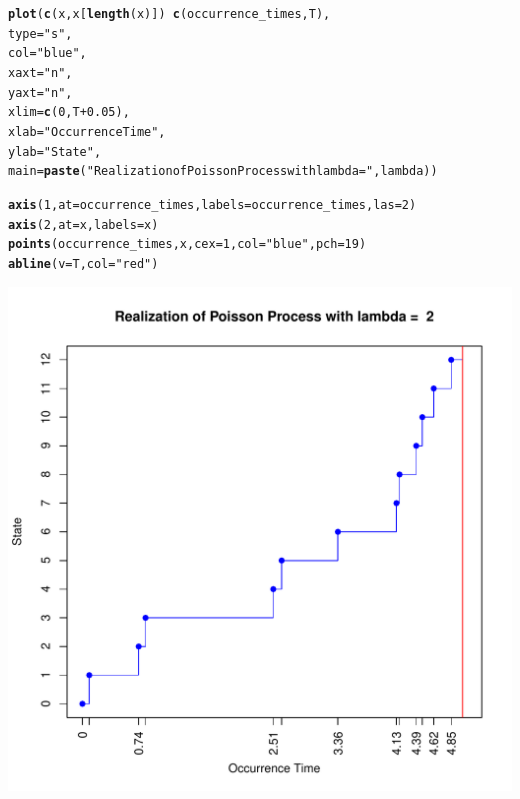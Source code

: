 \documentclass[11pt, a4paper]{article}\usepackage[]{graphicx}\usepackage[]{xcolor}
\makeatletter
\def\maxwidth{ %
  \ifdim\Gin@nat@width>\linewidth
    \linewidth
  \else
    \Gin@nat@width
  \fi
}
\newcommand{\hlnum}[1]{\textcolor[rgb]{0.686,0.059,0.569}{#1}}%
\newcommand{\hlsng}[1]{\textcolor[rgb]{0.192,0.494,0.8}{#1}}%
\newcommand{\hlopt}[1]{\textcolor[rgb]{0,0,0}{#1}}%
\newcommand{\hldef}[1]{\textcolor[rgb]{0.345,0.345,0.345}{#1}}%
\newcommand{\hlkwc}[1]{\textcolor[rgb]{0.333,0.667,0.333}{#1}}%
\newcommand{\hlkwd}[1]{\textcolor[rgb]{0.737,0.353,0.396}{\textbf{#1}}}%
\newenvironment{kframe}{%
 \def\at@end@of@kframe{}%
 \ifinner\ifhmode%
  \def\at@end@of@kframe{\end{minipage}}%
  \begin{minipage}{\columnwidth}%
 \fi\fi%
 \def\FrameCommand##1{\hskip\@totalleftmargin \hskip-\fboxsep
 \colorbox{shadecolor}{##1}\hskip-\fboxsep
     \hskip-\linewidth \hskip-\@totalleftmargin \hskip\columnwidth}%
 \MakeFramed {\advance\hsize-\width
   \@totalleftmargin\z@ \linewidth\hsize
   \@setminipage}}%
 {\par\unskip\endMakeFramed%
 \at@end@of@kframe}
\newenvironment{knitrout}{}{} %
\makeatother
\begin{document}
\begin{knitrout}
\color{fgcolor}\begin{kframe}
\begin{alltt}
\hlkwd{plot}\hldef{(}\hlkwd{c}\hldef{(x, x[}\hlkwd{length}\hldef{(x)])} \hlopt{~} \hlkwd{c}\hldef{(occurrence_times, T),}
     \hlkwc{type} \hldef{=} \hlsng{"s"}\hldef{,}
     \hlkwc{col} \hldef{=} \hlsng{"blue"}\hldef{,}
     \hlkwc{xaxt} \hldef{=} \hlsng{"n"}\hldef{,}
     \hlkwc{yaxt} \hldef{=} \hlsng{"n"}\hldef{,}
     \hlkwc{xlim} \hldef{=} \hlkwd{c}\hldef{(}\hlnum{0}\hldef{, T} \hlopt{+} \hlnum{0.05}\hldef{),}
     \hlkwc{xlab} \hldef{=} \hlsng{"Occurrence Time"}\hldef{,}
     \hlkwc{ylab} \hldef{=} \hlsng{"State"}\hldef{,}
     \hlkwc{main} \hldef{=} \hlkwd{paste}\hldef{(}\hlsng{"Realization of Poisson Process with lambda = "}\hldef{, lambda))}

\hlkwd{axis}\hldef{(}\hlnum{1}\hldef{,} \hlkwc{at} \hldef{= occurrence_times,} \hlkwc{labels} \hldef{= occurrence_times,} \hlkwc{las} \hldef{=} \hlnum{2}\hldef{)}
\hlkwd{axis}\hldef{(}\hlnum{2}\hldef{,} \hlkwc{at} \hldef{= x,} \hlkwc{labels} \hldef{= x)}
\hlkwd{points}\hldef{(occurrence_times, x,} \hlkwc{cex} \hldef{=} \hlnum{1}\hldef{,} \hlkwc{col} \hldef{=} \hlsng{"blue"}\hldef{,} \hlkwc{pch} \hldef{=} \hlnum{19}\hldef{)}
\hlkwd{abline}\hldef{(}\hlkwc{v} \hldef{= T,} \hlkwc{col} \hldef{=} \hlsng{"red"}\hldef{)}
\end{alltt}
\end{kframe}
\includegraphics[width=\maxwidth]{figure/unnamed-chunk-5-1} 
\end{knitrout}
\end{document}
